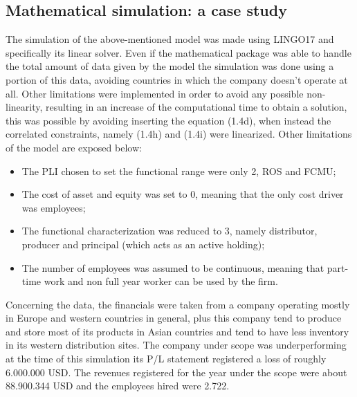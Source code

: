 \begin{doublespace}
\section{Mathematical simulation: a case study}
The simulation of the above-mentioned model was made using LINGO17 and specifically its linear solver. Even if the mathematical package was able to handle the total amount of data given by the model the simulation was done using a portion of this data, avoiding countries in which the company doesn't operate at all. Other limitations were implemented in order to avoid any possible non-linearity, resulting in an increase of the computational time to obtain a solution, this was possible by avoiding inserting the equation (1.4d), when instead the correlated constraints, namely (1.4h) and (1.4i) were linearized. Other limitations of the model are exposed below:
\begin{itemize}
    \item The PLI chosen to set the functional range were only 2, ROS and FCMU;
    \item The cost of asset and equity was set to 0, meaning that the only cost driver was employees;
    \item The functional characterization was reduced to 3, namely distributor, producer and principal (which acts as an active holding);
    \item The number of employees was assumed to be continuous, meaning that part-time work and non full year worker can be used by the firm.
\end{itemize}

Concerning the data, the financials were taken from a company operating mostly in Europe and western countries in general, plus this company tend to produce and store most of its products in Asian countries and tend to have less inventory in its western distribution sites. The company under scope was underperforming at the time of this simulation its P/L statement registered a loss of roughly  6.000.000 USD. The revenues registered for the year under the scope were about 88.900.344 USD and the employees hired were 2.722.


\end{doublespace}
